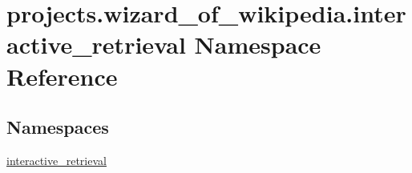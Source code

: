 \hypertarget{namespaceprojects_1_1wizard__of__wikipedia_1_1interactive__retrieval}{}\section{projects.\+wizard\+\_\+of\+\_\+wikipedia.\+interactive\+\_\+retrieval Namespace Reference}
\label{namespaceprojects_1_1wizard__of__wikipedia_1_1interactive__retrieval}
\subsection*{Namespaces}
\begin{DoxyCompactItemize}
\item 
 \hyperlink{namespaceprojects_1_1wizard__of__wikipedia_1_1interactive__retrieval_1_1interactive__retrieval}{interactive\+\_\+retrieval}
\end{DoxyCompactItemize}
